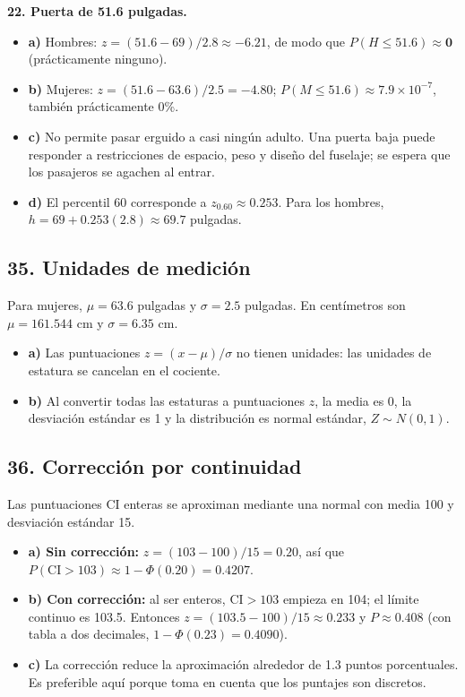 \documentclass[11pt]{article}
\begin{document}
\textbf{22. Puerta de 51.6 pulgadas.}
\begin{itemize}
  \item \textbf{a)} Hombres: $z=(51.6-69)/2.8\approx-6.21$, de modo que $P(H\le51.6)\approx\mathbf{0}$ (prácticamente ninguno).
  \item \textbf{b)} Mujeres: $z=(51.6-63.6)/2.5=-4.80$; $P(M\le51.6)\approx7.9\times10^{-7}$, también prácticamente 0\%.
  \item \textbf{c)} No permite pasar erguido a casi ningún adulto. Una puerta baja puede responder a restricciones de espacio, peso y diseño del fuselaje; se espera que los pasajeros se agachen al entrar.
  \item \textbf{d)} El percentil 60 corresponde a $z_{0.60}\approx0.253$. Para los hombres, $h=69+0.253(2.8)\approx\mathbf{69.7}$ pulgadas.
\end{itemize}

\subsection*{35. Unidades de medición}
Para mujeres, $\mu=63.6$ pulgadas y $\sigma=2.5$ pulgadas. En centímetros son $\mu=161.544$ cm y $\sigma=6.35$ cm.
\begin{itemize}
  \item \textbf{a)} Las puntuaciones $z=(x-\mu)/\sigma$ no tienen unidades: las unidades de estatura se cancelan en el cociente.
  \item \textbf{b)} Al convertir todas las estaturas a puntuaciones $z$, la media es 0, la desviación estándar es 1 y la distribución es normal estándar, $Z\sim N(0,1)$.
\end{itemize}

\subsection*{36. Corrección por continuidad}
Las puntuaciones CI enteras se aproximan mediante una normal con media 100 y desviación estándar 15.
\begin{itemize}
  \item \textbf{a) Sin corrección:} $z=(103-100)/15=0.20$, así que $P(\mathrm{CI}>103)\approx1-\Phi(0.20)=\mathbf{0.4207}$.
  \item \textbf{b) Con corrección:} al ser enteros, $\mathrm{CI}>103$ empieza en 104; el límite continuo es 103.5. Entonces $z=(103.5-100)/15\approx0.233$ y $P\approx\mathbf{0.408}$ (con tabla a dos decimales, $1-\Phi(0.23)=0.4090$).
  \item \textbf{c)} La corrección reduce la aproximación alrededor de 1.3 puntos porcentuales. Es preferible aquí porque toma en cuenta que los puntajes son discretos.
\end{itemize}
\end{document}
